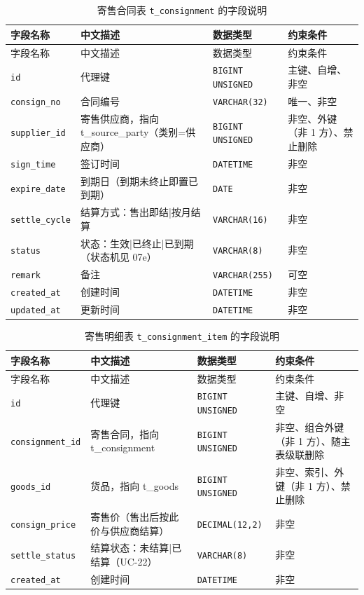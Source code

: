 \documentclass[12pt, a4paper]{ctexart}
\newcommand{\code}[1]{\texttt{\small #1}}
\begin{document}
\begin{longtable}{@{}p{3.1cm} p{4.5cm} p{2.4cm} p{4.5cm}@{}}
\caption{寄售合同表 \code{t\_consignment} 的字段说明}\label{tab:f-t-consignment}\\
\toprule
字段名称 & 中文描述 & 数据类型 & 约束条件 \\
\midrule
\endfirsthead
\toprule
字段名称 & 中文描述 & 数据类型 & 约束条件 \\
\midrule
\endhead
\bottomrule
\endlastfoot
\code{id} & 代理键 & \code{BIGINT UNSIGNED} & 主键、自增、非空 \\
\code{consign\_no} & 合同编号 & \code{VARCHAR(32)} & 唯一、非空 \\
\code{supplier\_id} & 寄售供应商，指向 t\_source\_party（类别=供应商） & \code{BIGINT UNSIGNED} & 非空、外键（非 1 方）、禁止删除 \\
\code{sign\_time} & 签订时间 & \code{DATETIME} & 非空 \\
\code{expire\_date} & 到期日（到期未终止即置已到期） & \code{DATE} & 非空 \\
\code{settle\_cycle} & 结算方式：售出即结|按月结算 & \code{VARCHAR(16)} & 非空 \\
\code{status} & 状态：生效|已终止|已到期（状态机见 07e） & \code{VARCHAR(8)} & 非空 \\
\code{remark} & 备注 & \code{VARCHAR(255)} & 可空 \\
\code{created\_at} & 创建时间 & \code{DATETIME} & 非空 \\
\code{updated\_at} & 更新时间 & \code{DATETIME} & 非空 \\
\end{longtable}

\begin{longtable}{@{}p{3.1cm} p{4.5cm} p{2.4cm} p{4.5cm}@{}}
\caption{寄售明细表 \code{t\_consignment\_item} 的字段说明}\label{tab:f-t-consignment-item}\\
\toprule
字段名称 & 中文描述 & 数据类型 & 约束条件 \\
\midrule
\endfirsthead
\toprule
字段名称 & 中文描述 & 数据类型 & 约束条件 \\
\midrule
\endhead
\bottomrule
\endlastfoot
\code{id} & 代理键 & \code{BIGINT UNSIGNED} & 主键、自增、非空 \\
\code{consignment\_id} & 寄售合同，指向 t\_consignment & \code{BIGINT UNSIGNED} & 非空、组合外键（非 1 方）、随主表级联删除 \\
\code{goods\_id} & 货品，指向 t\_goods & \code{BIGINT UNSIGNED} & 非空、索引、外键（非 1 方）、禁止删除 \\
\code{consign\_price} & 寄售价（售出后按此价与供应商结算） & \code{DECIMAL(12,2)} & 非空 \\
\code{settle\_status} & 结算状态：未结算|已结算（UC-22） & \code{VARCHAR(8)} & 非空 \\
\code{created\_at} & 创建时间 & \code{DATETIME} & 非空 \\
\end{longtable}
\end{document}
